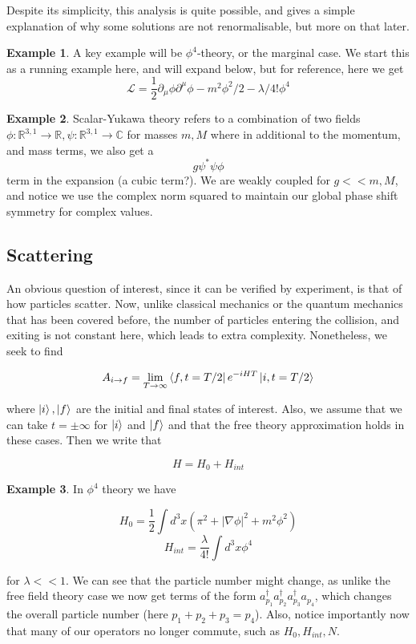 \documentclass{article}
\theoremstyle{definition}
\newtheorem{example}{Example}
\begin{document}
Despite its simplicity, this analysis is quite possible, and gives a simple
explanation of why some solutions are not renormalisable, but more on that
later.

\begin{example}
  A key example will be $\phi^4$-theory, or the marginal case. We start this as
  a running example here, and will expand below, but for reference, here we get
  $$ \mathcal{L} = \frac{1}{2} \partial_\mu \phi \partial^\mu \phi - m^2 \phi^2
  / 2 - \lambda / 4! \phi^4 $$
\end{example}

\begin{example}
  Scalar-Yukawa theory refers to a combination of two fields $\phi :
  \mathbb{R}^{3, 1} \to \mathbb{R}, \psi: \mathbb{R}^{3, 1} \to \mathbb{C}$ for
  masses $m, M$ where in additional to the momentum, and mass terms, we also get
  a
  $$ g \psi^* \psi \phi $$
  term in the expansion (a cubic term?). We are weakly coupled for $g << m, M$,
  and notice we use the complex norm squared to maintain our global phase shift
  symmetry for complex values.
\end{example}

\subsection{Scattering}

An obvious question of interest, since it can be verified by experiment, is that
of how particles scatter. Now, unlike classical mechanics or the quantum
mechanics that has been covered before, the number of particles entering the
collision, and exiting is not constant here, which leads to extra complexity.
Nonetheless, we seek to find

$$ A_{i\to f} = \lim_{T \to \infty} \bra{f, t = T/2} e^{-iHT} \ket{i, t =
  T/2} $$

where $\ket{i}, \ket{f}$ are the initial and final states of interest. Also, we
assume that we can take $t = \pm \infty$ for $\ket{i}$ and $\ket{f}$ and that
the free theory approximation holds in these cases. Then we write that

$$ H = H_0 + H_{int} $$

\begin{example}
  In $\phi^4$ theory we have

  $$ H_0 = \frac{1}{2} \int d^3x (\pi^2 + |\nabla \phi|^2 + m^2 \phi^2) $$
  $$ H_{int} = \frac{\lambda}{4!} \int d^3x \phi^4 $$

  for $\lambda << 1$. We can see that the particle number might change, as
  unlike the free field theory case we now get terms of the form
  $a_{p_1}^\dagger a_{p_2}^\dagger a_{p_3}^\dagger a_{p_4}$, which changes the
  overall particle number (here $p_1 + p_2 + p_3 = p_4$). Also, notice
  importantly now that many of our operators no longer commute, such as $H_0,
  H_{int}, N$.
\end{example}
\end{document}
